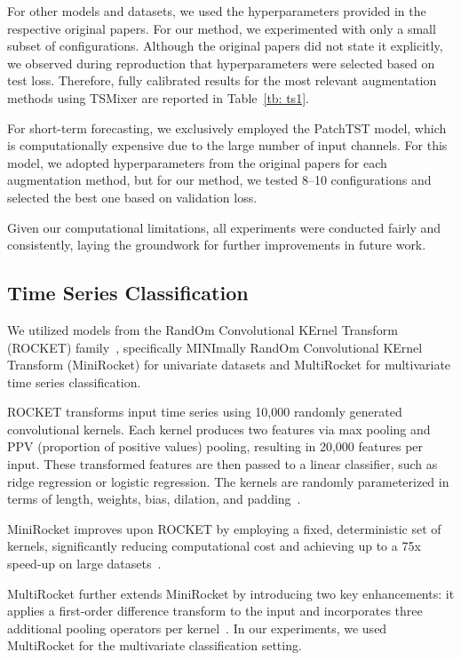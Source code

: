 For other models and datasets, we used the hyperparameters provided in the respective original papers. For our method, we experimented with only a small subset of configurations. Although the original papers did not state it explicitly, we observed during reproduction that hyperparameters were selected based on test loss. Therefore, fully calibrated results for the most relevant augmentation methods using TSMixer are reported in Table~\ref{tb: ts1}.


For short-term forecasting, we exclusively employed the PatchTST model, which is computationally expensive due to the large number of input channels. For this model, we adopted hyperparameters from the original papers for each augmentation method, but for our method, we tested 8–10 configurations and selected the best one based on validation loss.

Given our computational limitations, all experiments were conducted fairly and consistently, laying the groundwork for further improvements in future work.


\subsection*{Time Series Classification} \label{subsec:experimental_setup-tsc}



We utilized models from the RandOm Convolutional KErnel Transform (ROCKET) family~\cite{Dempster_2020}, specifically MINImally RandOm Convolutional KErnel Transform (MiniRocket)\cite{Dempster_2021} for univariate datasets and MultiRocket\cite{tan2022multirocketmultiplepoolingoperators} for multivariate time series classification.

ROCKET transforms input time series using 10,000 randomly generated convolutional kernels. Each kernel produces two features via max pooling and PPV (proportion of positive values) pooling, resulting in 20,000 features per input. These transformed features are then passed to a linear classifier, such as ridge regression or logistic regression. The kernels are randomly parameterized in terms of length, weights, bias, dilation, and padding~\cite{Dempster_2020}.

MiniRocket improves upon ROCKET by employing a fixed, deterministic set of kernels, significantly reducing computational cost and achieving up to a 75x speed-up on large datasets~\cite{Dempster_2020, Dempster_2021}.

MultiRocket further extends MiniRocket by introducing two key enhancements: it applies a first-order difference transform to the input and incorporates three additional pooling operators per kernel~\cite{tan2022multirocketmultiplepoolingoperators}. In our experiments, we used MultiRocket for the multivariate classification setting.

